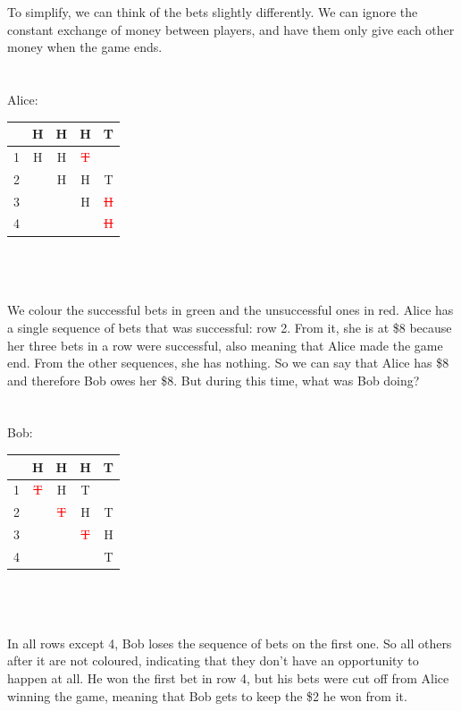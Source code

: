 \documentclass[english,12pt,a4paper,final]{article}
\begin{document}
To simplify, we can think of the bets slightly differently. We can ignore the constant exchange of money between players, and have them only give each other money when the game ends.
\\\\\\
Alice:
\begin{tabular}{|c|c|c|c|c|}
	\hline
	& H & H & H & T \\
	\hline
	1 & \textcolor{OliveGreen}{H} & \textcolor{OliveGreen}{H} & \textcolor{red}{\sout{T}} &  \\
	\hline
	2 &  & \textcolor{OliveGreen}{H} & \textcolor{OliveGreen}{H} & \textcolor{OliveGreen}{T} \\
	\hline
	3 &  &  & \textcolor{OliveGreen}{H} & \textcolor{red}{\sout{H}} \\
	\hline
	4 &  &  &  & \textcolor{red}{\sout{H}} \\
	\hline
\end{tabular}
\\\\\\
We colour the successful bets in green and the unsuccessful ones in red. Alice has a single sequence of bets that was successful: row 2. From it, she is at \$8 because her three bets in a row were successful, also meaning that Alice made the game end. From the other sequences, she has nothing. So we can say that Alice has \$8 and therefore Bob owes her \$8. But during this time, what was Bob doing?
\\\\\\
Bob:
\begin{tabular}{|c|c|c|c|c|}
	\hline
	& H & H & H & T \\
	\hline
	1 & \textcolor{red}{\sout{T}} & H & T &  \\
	\hline
	2 &  & \textcolor{red}{\sout{T}} & H & T \\
	\hline
	3 &  &  & \textcolor{red}{\sout{T}} & H \\
	\hline
	4 &  &  &  & \textcolor{OliveGreen}{T} \\
	\hline
\end{tabular}
\\\\\\
In all rows except 4, Bob loses the sequence of bets on the first one. So all others after it are not coloured, indicating that they don't have an opportunity to happen at all. He won the first bet in row 4, but his bets were cut off from Alice winning the game, meaning that Bob gets to keep the \$2 he won from it.
\end{document}
